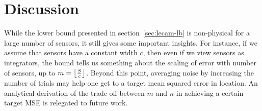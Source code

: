 \documentclass[conference]{IEEEtran}
\providecommand{\v}{}
\renewcommand{\v}[1]{\underline{#1}}
\providecommand{\vhat}{}
\renewcommand{\vhat}[1]{\underline{\hat{#1}}}
\DeclarePairedDelimiter\abs{\lvert}{\rvert}
\DeclarePairedDelimiter\norm{\lVert}{\rVert}
\DeclarePairedDelimiter\floor{\lfloor}{\rfloor}
\newcommand{\Phiorho}{\Phi\!\circ\!\rho}
\begin{document}




\section{Discussion}
\label{sec:discussion}

While the lower bound presented in section~\ref{sec:lecam-lb} is non-physical
for a large number of sensors, it still gives some important insights. For
instance, if we assume that sensors have a constant width $c$, then even if we
view sensors as integrators, the bound tells us something about the scaling of
error with number of sensors, up to $m = \floor*{\frac{S}{c}}$. Beyond this
point, averaging noise by increasing the number of trials may help one get to a
target mean squared error in location. An analytical derivation of the
trade-off between $m$ and $n$ in achieving a certain target MSE is relegated to
future work.
\end{document}

